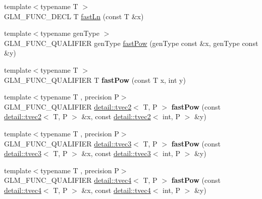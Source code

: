 \begin{DoxyCompactItemize}
\item 
{\footnotesize template$<$typename T $>$ }\\G\+L\+M\+\_\+\+F\+U\+N\+C\+\_\+\+D\+E\+CL T \hyperlink{group__gtx__fast__exponential_ga8f27c4779039f88ae790a9a69be01630}{fast\+Ln} (const T \&x)
\item 
{\footnotesize template$<$typename gen\+Type $>$ }\\G\+L\+M\+\_\+\+F\+U\+N\+C\+\_\+\+Q\+U\+A\+L\+I\+F\+I\+ER gen\+Type \hyperlink{group__gtx__fast__exponential_ga842ec5e981c76f8aae7ae14972795378}{fast\+Pow} (gen\+Type const \&x, gen\+Type const \&y)
\item 
{\footnotesize template$<$typename T $>$ }\\G\+L\+M\+\_\+\+F\+U\+N\+C\+\_\+\+Q\+U\+A\+L\+I\+F\+I\+ER T {\bfseries fast\+Pow} (const T x, int y)\hypertarget{namespaceglm_a2aaec425ec510772b4611f75b9b5f67b}{}\label{namespaceglm_a2aaec425ec510772b4611f75b9b5f67b}

\item 
{\footnotesize template$<$typename T , precision P$>$ }\\G\+L\+M\+\_\+\+F\+U\+N\+C\+\_\+\+Q\+U\+A\+L\+I\+F\+I\+ER \hyperlink{structglm_1_1detail_1_1tvec2}{detail\+::tvec2}$<$ T, P $>$ {\bfseries fast\+Pow} (const \hyperlink{structglm_1_1detail_1_1tvec2}{detail\+::tvec2}$<$ T, P $>$ \&x, const \hyperlink{structglm_1_1detail_1_1tvec2}{detail\+::tvec2}$<$ int, P $>$ \&y)\hypertarget{namespaceglm_a91a0f63bf5d10bb64f4f50df7a102d14}{}\label{namespaceglm_a91a0f63bf5d10bb64f4f50df7a102d14}

\item 
{\footnotesize template$<$typename T , precision P$>$ }\\G\+L\+M\+\_\+\+F\+U\+N\+C\+\_\+\+Q\+U\+A\+L\+I\+F\+I\+ER \hyperlink{structglm_1_1detail_1_1tvec3}{detail\+::tvec3}$<$ T, P $>$ {\bfseries fast\+Pow} (const \hyperlink{structglm_1_1detail_1_1tvec3}{detail\+::tvec3}$<$ T, P $>$ \&x, const \hyperlink{structglm_1_1detail_1_1tvec3}{detail\+::tvec3}$<$ int, P $>$ \&y)\hypertarget{namespaceglm_a82f246b4681436e1a32c28e5e967f48d}{}\label{namespaceglm_a82f246b4681436e1a32c28e5e967f48d}

\item 
{\footnotesize template$<$typename T , precision P$>$ }\\G\+L\+M\+\_\+\+F\+U\+N\+C\+\_\+\+Q\+U\+A\+L\+I\+F\+I\+ER \hyperlink{structglm_1_1detail_1_1tvec4}{detail\+::tvec4}$<$ T, P $>$ {\bfseries fast\+Pow} (const \hyperlink{structglm_1_1detail_1_1tvec4}{detail\+::tvec4}$<$ T, P $>$ \&x, const \hyperlink{structglm_1_1detail_1_1tvec4}{detail\+::tvec4}$<$ int, P $>$ \&y)\hypertarget{namespaceglm_a63ff761e1385c85dcf82e75628710e3e}{}\label{namespaceglm_a63ff761e1385c85dcf82e75628710e3e}


\end{DoxyCompactItemize}

